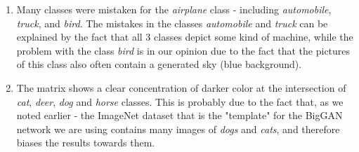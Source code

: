 \documentclass[11pt,a4paper,openany]{book}
\begin{document}
\begin{enumerate}
\item Many classes were mistaken for the \textit{airplane} class - including \textit{automobile}, \textit{truck}, and \textit{bird}. The mistakes in the classes \textit{automobile} and \textit{truck} can be explained by the fact that all 3 classes depict some kind of machine, while the problem with the class \textit{bird} is in our opinion due to the fact that the pictures of this class also often contain a generated sky (blue background).
\item The matrix shows a clear concentration of darker color at the intersection of \textit{cat}, \textit{deer}, \textit{dog} and \textit{horse} classes. This is probably due to the fact that, as we noted earlier - the ImageNet dataset that is the "template" for the BigGAN network we are using contains many images of \textit{dogs} and \textit{cats}, and therefore biases the results towards them.
\end{enumerate}
\end{document}
